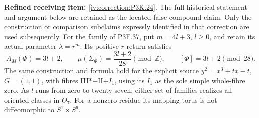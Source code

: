 \begin{theorem}\hypertarget{tag-02U4}{}\label{night:P3K.24}

\par\noindent\textbf{Refined receiving item:} \cref{iv:correction:P3K.24}. The full historical statement and argument below are retained as the located false compound claim. Only the construction or comparison subclaims expressly identified in that correction are used subsequently.
For the family of P3F.37, put $m=4l+3$, $l\ge0$, and retain
its actual parameter $\lambda=r^m$. Its positive $r$-return
satisfies
\[
 A_M(\Phi)=3l+2,\qquad
 \mu(\Sigma_\Phi)=\frac{3l+2}{28}\pmod{\mathbb Z},
 \qquad [\Phi]=3l+2\pmod{28}.                         \tag{K24.1}
\]
The same construction and formula hold for the explicit source
$y^2=x^3+tx-t$, $G=(1,1)$, with fibres III*$+$II$+I_1$,
using its $I_1$ as the sole simple whole-fibre zero. As $l$ runs
from zero to twenty-seven, either set of families realizes all
oriented classes in $\Theta_7$. For a nonzero residue its mapping
torus is not diffeomorphic to $S^1\times S^6$.
\end{theorem}

